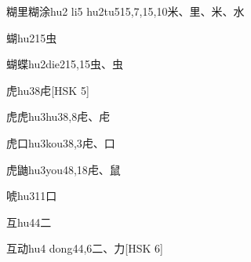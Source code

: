 \begin{EntryWithPhonetic}{糊里糊涂}{hu2 li5 hu2tu5}{15,7,15,10}{⽶、⾥、⽶、⽔}
\end{EntryWithPhonetic}

\begin{EntryWithPhonetic}{蝴}{hu2}{15}{⾍}
\end{EntryWithPhonetic}

\begin{EntryWithPhonetic}{蝴蝶}{hu2die2}{15,15}{⾍、⾍}
\end{EntryWithPhonetic}

\begin{EntryWithPhonetic}{虎}{hu3}{8}{⾌}[HSK 5]
\end{EntryWithPhonetic}

\begin{EntryWithPhonetic}{虎虎}{hu3hu3}{8,8}{⾌、⾌}
\end{EntryWithPhonetic}

\begin{EntryWithPhonetic}{虎口}{hu3kou3}{8,3}{⾌、⼝}
\end{EntryWithPhonetic}

\begin{EntryWithPhonetic}{虎鼬}{hu3you4}{8,18}{⾌、⿏}
\end{EntryWithPhonetic}

\begin{EntryWithPhonetic}{唬}{hu3}{11}{⼝}
\end{EntryWithPhonetic}

\begin{EntryWithPhonetic}{互}{hu4}{4}{⼆}
\end{EntryWithPhonetic}

\begin{EntryWithPhonetic}{互动}{hu4 dong4}{4,6}{⼆、⼒}[HSK 6]
\end{EntryWithPhonetic}

